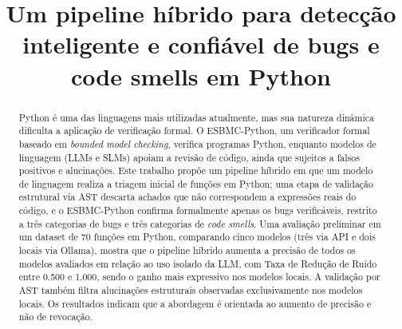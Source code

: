 \documentclass[sigconf]{acmart}
\begin{document}
\title{Um pipeline híbrido para detecção inteligente e confiável de bugs e code smells em Python}




%
%
%

\renewcommand{\shorttitle}{Pipeline Híbrido LLM+ESBMC-Python}

\renewcommand\abstractname{Resumo}
\renewcommand\keywordsname{Palavras-chave}
\renewcommand\refname{Referências}

\begin{abstract}
Python é uma das linguagens mais utilizadas atualmente, mas sua natureza dinâmica dificulta a aplicação de verificação formal. O ESBMC-Python, um verificador formal baseado em \textit{bounded model checking}, verifica programas Python, enquanto modelos de linguagem (LLMs e SLMs) apoiam a revisão de código, ainda que sujeitos a falsos positivos e alucinações. Este trabalho propõe um pipeline híbrido em que um modelo de linguagem realiza a triagem inicial de funções em Python; uma etapa de validação estrutural via AST descarta achados que não correspondem a expressões reais do código, e o ESBMC-Python confirma formalmente apenas os bugs verificáveis, restrito a três categorias de bugs e três categorias de \textit{code smells}. Uma avaliação preliminar em um dataset de 70 funções em Python, comparando cinco modelos (três via API e dois locais via Ollama), mostra que o pipeline híbrido aumenta a precisão de todos os modelos avaliados em relação ao uso isolado da LLM, com Taxa de Redução de Ruído entre 0.500 e 1.000, sendo o ganho mais expressivo nos modelos locais. A validação por AST também filtra alucinações estruturais observadas exclusivamente nos modelos locais. Os resultados indicam que a abordagem é orientada ao aumento de precisão e não de revocação.
\end{abstract}
\end{document}
